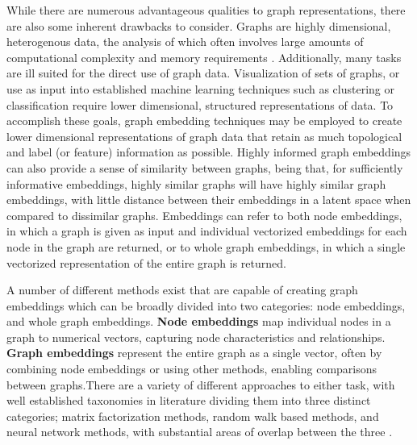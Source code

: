 \documentclass[
  super,
  preprint,
  3p]{elsarticle}
\begin{document}
While there are numerous advantageous qualities to graph
representations, there are also some inherent drawbacks to consider.
Graphs are highly dimensional, heterogenous data, the analysis of which
often involves large amounts of computational complexity and memory
requirements \citep{cai_comprehensive_2018}. Additionally, many tasks
are ill suited for the direct use of graph data. Visualization of sets
of graphs, or use as input into established machine learning techniques
such as clustering or classification require lower dimensional,
structured representations of data. To accomplish these goals, graph
embedding techniques may be employed to create lower dimensional
representations of graph data that retain as much topological and label
(or feature) information as possible. Highly informed graph embeddings
can also provide a sense of similarity between graphs, being that, for
sufficiently informative embeddings, highly similar graphs will have
highly similar graph embeddings, with little distance between their
embeddings in a latent space when compared to dissimilar graphs.
Embeddings can refer to both node embeddings, in which a graph is given
as input and individual vectorized embeddings for each node in the graph
are returned, or to whole graph embeddings, in which a single vectorized
representation of the entire graph is returned.

A number of different methods exist that are capable of creating graph
embeddings which can be broadly divided into two categories: node
embeddings, and whole graph embeddings. \textbf{Node embeddings} map
individual nodes in a graph to numerical vectors, capturing node
characteristics and relationships. \textbf{Graph embeddings} represent
the entire graph as a single vector, often by combining node embeddings
or using other methods, enabling comparisons between graphs.There are a
variety of different approaches to either task, with well established
taxonomies in literature dividing them into three distinct categories;
matrix factorization methods, random walk based methods, and neural
network methods, with substantial areas of overlap between the three
\citep{xu_understanding_2021, goyal_graph_2018}.
\end{document}
